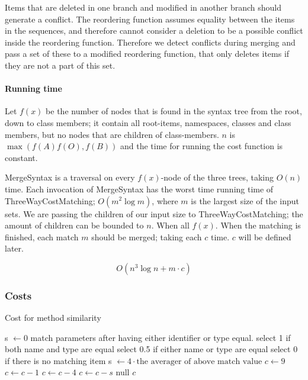 \documentclass[11pt]{article}
\begin{document}
Items that are deleted in one branch and modified in another branch should generate a conflict. The reordering function assumes equality between the items in the sequences, and therefore cannot consider a deletion to be a possible conflict inside the reordering function. Therefore we detect conflicts during merging and pass a set of these to a modified reordering function, that only deletes items if they are not a part of this set.

\paragraph{Running time} Let $f(x)$ be the number of nodes that is found in the syntax tree from the root, down to class members; it contain all root-items, namespaces, classes and class members, but no nodes that are children of class-members. $n$ is $\max(f(A) f(O), f(B))$ and the time for running the cost function is constant. 

MergeSyntax is a traversal on every $f(x)$-node of the three trees, taking $O(n)$ time. Each invocation of MergeSyntax has the worst time running time of ThreeWayCostMatching; $O(m^2 \log m)$, where $m$ is the largest size of the input sets. We are passing the children of our input size to ThreeWayCostMatching; the amount of children can be bounded to $n$. When all $f(x)$. When the matching is finished, each match $m$ should be merged; taking each $c$ time. $c$ will be defined later.

\begin{equation}
O(n^3 \log n + m \cdot c)  \nonumber
\end{equation}

\subsubsection{Costs}

\begin{algorithm}
\caption{Cost for method similarity}
\label{MethodCostFunction}
\begin{algorithmic}
   \State s $\gets 0$
      \State match parameters after having either identifier or type equal.
	      \State select 1 if both name and type are equal
    	  \State select 0.5 if either name or type are equal
	      \State select 0 if there is no matching item
      \EndFor
      \State s $\gets 4 \cdot \text{the averager of above match value}$
   \EndIf
   \State $c \gets 9$
      \State $c \gets c - 1$
   \EndIf
      \State $c \gets c - 4$
   \EndIf
   \State $c \gets c - s$
         \State \Return null 
   \EndIf
   \State \Return $c$
\EndFunction
\end{algorithmic}
\end{algorithm}
\end{document}
